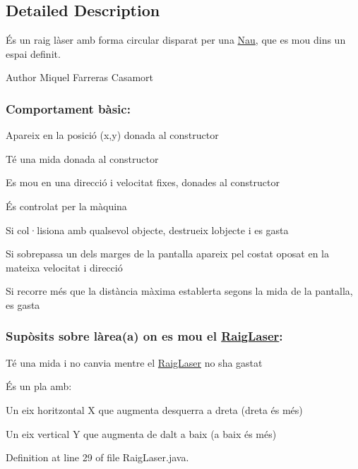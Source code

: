 \subsection{Detailed Description}
És un raig làser amb forma circular disparat per una \hyperlink{class_nau}{Nau}, que es mou dins un espai definit. 

\begin{DoxyAuthor}{Author}
Miquel Farreras Casamort
\end{DoxyAuthor}
\subsubsection*{Comportament bàsic\+: }


\begin{DoxyItemize}
\item Apareix en la posició (x,y) donada al constructor
\item Té una mida donada al constructor
\item Es mou en una direcció i velocitat fixes, donades al constructor
\item És controlat per la màquina
\item Si col·lisiona amb qualsevol objecte, destrueix l\textquotesingle{}objecte i es gasta
\item Si sobrepassa un dels marges de la pantalla apareix pel costat oposat en la mateixa velocitat i direcció
\item Si recorre més que la distància màxima establerta segons la mida de la pantalla, es gasta
\end{DoxyItemize}

\subsubsection*{Supòsits sobre l\textquotesingle{}àrea(a) on es mou el \hyperlink{class_raig_laser}{Raig\+Laser}\+: }

Té una mida i no canvia mentre el \hyperlink{class_raig_laser}{Raig\+Laser} no s\textquotesingle{}ha gastat

És un pla amb\+:
\begin{DoxyItemize}
\item Un eix horitzontal X que augmenta d\textquotesingle{}esquerra a dreta (dreta és més)
\item Un eix vertical Y que augmenta de dalt a baix (a baix és més) 
\end{DoxyItemize}

Definition at line 29 of file Raig\+Laser.\+java.



